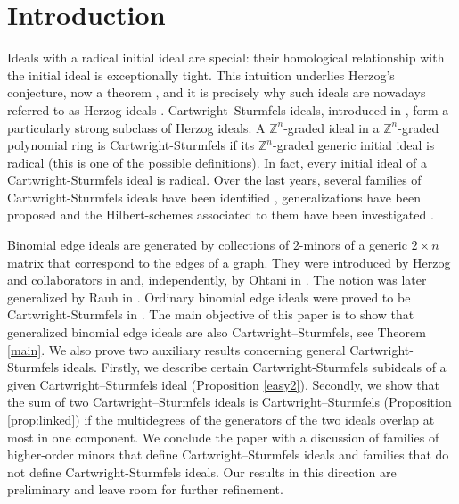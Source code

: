 \documentclass{amsart}
\theoremstyle{definition}
\numberwithin{equation}{section}
\def\ZZ{\mathbb{Z}}
\begin{document}
\section{Introduction}

Ideals with a radical initial ideal are special: their homological relationship with the initial ideal is exceptionally tight. This intuition underlies Herzog’s conjecture, now a theorem \cite{CoVa}, and it is precisely why such ideals are nowadays referred to as Herzog ideals \cite{HTVW}.
Cartwright–Sturmfels ideals, introduced in \cite{CDG2}, form a particularly strong subclass of Herzog ideals. A $\ZZ^n$-graded ideal in a $\ZZ^n$-graded polynomial ring is Cartwright-Sturmfels if its $\ZZ^n$-graded generic initial ideal is radical (this is one of the possible definitions). In fact, every initial ideal of a Cartwright-Sturmfels ideal is radical.
Over the last years, several families of Cartwright-Sturmfels ideals have been identified \cite{CDG1,CDG2,CDG3,CDG4,CDG5,CoWe,MaTa}, generalizations have been proposed \cite{CCC} and the Hilbert-schemes associated to them have been investigated \cite{RaSa}. 

Binomial edge ideals are generated by collections of $2$-minors of a generic $2\times n$ matrix that correspond to the edges of a graph. They were introduced by Herzog and collaborators in \cite{HHHKR} and, independently, by Ohtani in \cite{Ohtani}. The notion  was later generalized by Rauh in \cite{Rauh}. Ordinary binomial edge ideals were proved to be Cartwright-Sturmfels in \cite{CDG4,CDG5}.
The main objective of this paper is to show that generalized binomial edge ideals are also Cartwright–Sturmfels, see  Theorem \ref{main}.  We also prove two auxiliary results concerning general Cartwright-Sturmfels ideals. Firstly, we describe  certain  Cartwright-Sturmfels subideals of a given Cartwright–Sturmfels ideal (Proposition \ref{easy2}). Secondly, we show that the sum of two Cartwright–Sturmfels ideals is Cartwright–Sturmfels (Proposition \ref{prop:linked}) if the multidegrees of the generators of the two ideals overlap at most in one component. 
We conclude the paper with a discussion of families of higher-order minors that define Cartwright–Sturmfels ideals and families that do not define 
Cartwright-Sturmfels ideals. Our results in this direction are preliminary and leave room for further refinement.

 

\end{document}
